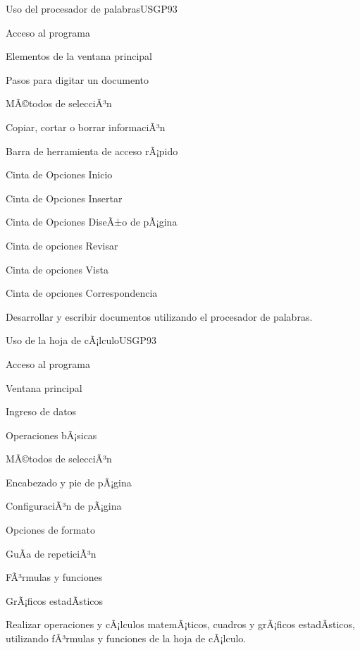 \begin{syllabus}
\begin{unit}{Uso del procesador de palabras}{USGP}{9}{3}
\begin{topics}
      \item Acceso al programa
      \item Elementos de la ventana principal
      \item Pasos para digitar un documento
      \item MÃ©todos de selecciÃ³n
      \item Copiar, cortar o borrar informaciÃ³n
      \item Barra de herramienta de acceso rÃ¡pido
      \item Cinta de Opciones Inicio
      \item Cinta de Opciones Insertar
      \item Cinta de Opciones DiseÃ±o de pÃ¡gina
      \item Cinta de opciones Revisar
      \item Cinta de opciones Vista
      \item Cinta de opciones Correspondencia
\end{topics}
\begin{unitgoals}
   \item Desarrollar y escribir documentos utilizando el procesador de palabras.
\end{unitgoals}
\end{unit}

\begin{unit}{Uso de la hoja de cÃ¡lculo}{USGP}{9}{3}
\begin{topics}
      \item Acceso al programa
      \item Ventana principal
      \item Ingreso de datos 
      \item Operaciones bÃ¡sicas 
      \item MÃ©todos de selecciÃ³n 
      \item Encabezado y pie de pÃ¡gina 
      \item ConfiguraciÃ³n de pÃ¡gina 
      \item Opciones de formato 
      \item GuÃ­a de repeticiÃ³n
      \item FÃ³rmulas y funciones 
      \item GrÃ¡ficos estadÃ­sticos
\end{topics}
\begin{unitgoals}
   \item Realizar operaciones y cÃ¡lculos matemÃ¡ticos, cuadros y grÃ¡ficos estadÃ­sticos, utilizando fÃ³rmulas y funciones de la hoja de cÃ¡lculo.
\end{unitgoals}
\end{unit}


\end{syllabus}
